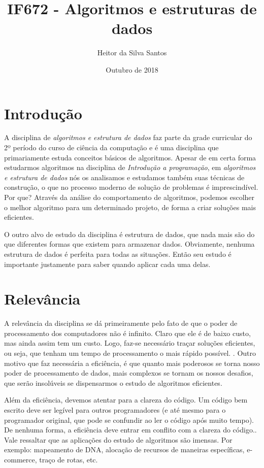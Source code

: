 \documentclass{article}
\title{IF672 - Algoritmos e estruturas de dados}
\author{Heitor da Silva Santos}
\date{Outubro de 2018}
\begin{document}
\maketitle

\section{Introdução}
A disciplina de {\itshape algoritmos e estrutura de dados} faz parte da grade curricular do 2º período do curso de ciência da computação e é uma disciplina que primariamente estuda conceitos básicos de algoritmos.\citep{CIn} Apesar de em certa forma estudarmos algoritmos na disciplina de {\itshape Introdução a programação}, em {\itshape algoritmos e estrutura de dados} nós os analisamos e estudamos também suas técnicas de construção, o que no processo moderno de solução de problemas é imprescindível.\citep{Proj} Por que? Através da análise do comportamento de algoritmos, podemos escolher o melhor algoritmo para um determinado projeto, de forma a criar soluções mais eficientes\citep{wiki:xxx}. 

O outro alvo de estudo da disciplina é estrutura de dados, que nada mais são do que diferentes formas que existem para armazenar dados. Obviamente, nenhuma estrutura de dados é perfeita para todas as situações. Então seu estudo é importante justamente para saber quando aplicar cada uma delas.\citep{Cormen}

\section{Relevância}
A relevância da disciplina se dá primeiramente pelo fato de que o poder de processamento dos computadores não é infinito. Claro que ele é de baixo custo, mas ainda assim tem um custo. Logo, faz-se necessário traçar soluções eficientes, ou seja, que tenham um tempo de processamento o mais rápido possível. \citep{Cormen}. Outro motivo que faz necessária a eficiência, é que quanto mais poderosos se torna nosso poder de processamento de dados, mais complexos se tornam os nossos desafios\citep{CIn}, que serão insolúveis se dispensarmos o estudo de algoritmos eficientes.

Além da eficiência, devemos atentar para a clareza do código. Um código bem escrito deve ser legível para outros programadores (e até mesmo para o programador original, que pode se confundir ao ler o código após muito tempo). De nenhuma forma, a eficiência deve entrar em conflito com a clareza do código.\citep{CIn}. Vale ressaltar que as aplicações do estudo de algoritmos são imensas. Por exemplo: mapeamento de DNA, alocação de recursos de maneiras específicas, e-commerce, traço de rotas, etc. \citep{Cormen}
\end{document}
